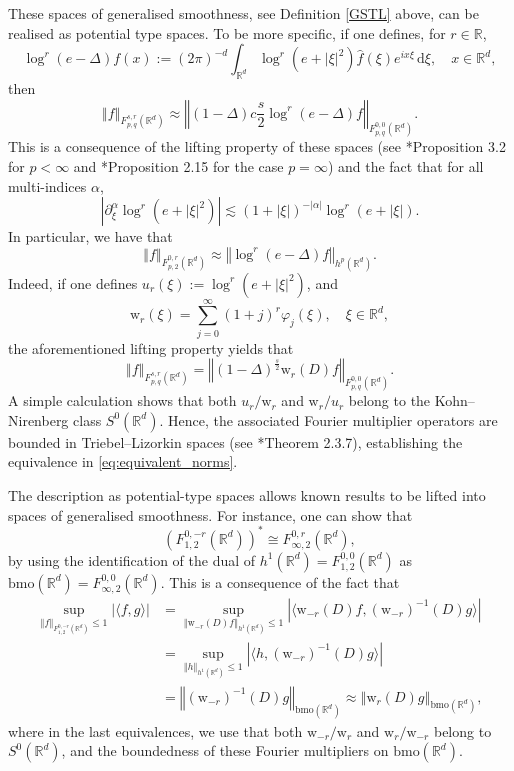 \documentclass[a4paper, leqno, 10pt]{amsart}
\numberwithin{equation}{section}
\newcommand{\dd}{\mathrm{d}}
\newcommand{\R}{\mathbb{R}}
\newcommand{\norm}[1]{\left\Vert#1\right\Vert}
\newcommand{\brkt}[1]{\left(#1\right)}
\newcommand{\abs}[1]{\left|#1\right|}
\begin{document}
These spaces of generalised smoothness, see Definition \ref{GSTL} above, can be realised as potential type spaces. To be more specific, if one defines, for $r\in \R$,
\[
\log^r(e-\Delta)f(x) :=(2\pi)^{-d}\int_{\R^d} \log^r(e+\abs{\xi}^2) \widehat{f}(\xi) e^{i x\xi} \, \dd \xi, \quad x \in \R^d,
\]
then 
\begin{equation}\label{eq:equivalent_norms}
\norm{f}_{F^{s,r}_{p,q} (\R^d) }\approx	\norm{(1-\Delta)c\frac{s}{2} \log^r(e-\Delta)f}_{F^{0,0}_{p,q} (\R^d) }.
\end{equation}
This is a consequence of the lifting property of these spaces (see \cite{cae-mou}*{Proposition 3.2} for $p<\infty$ and \cite{AR3}*{Proposition 2.15} for the case $p=\infty$) and the fact that for all multi-indices $\alpha$, 
\begin{equation}\label{right_symbol_class}
\abs{\partial_\xi^\alpha \log^r(e+\abs{\xi}^2)}\lesssim (1+\abs{\xi})^{-\abs{\alpha}}{\log^r(e+\abs{\xi})}.
\end{equation}
In particular, we have that
\[
\norm{f}_{F^{0,r}_{p,2}(\R^d)}\approx \norm{\log^r(e-\Delta)f}_{h^p(\R^d)}.
\]
Indeed, if one defines $u_r(\xi):=\log^r(e+\abs{\xi}^2)$,  and 
\begin{equation}\label{log_symbol}
\mathrm{w}_r(\xi)=\sum_{j=0}^\infty (1+j)^r\varphi_j(\xi),\quad \xi\in\R^d,
\end{equation}
the aforementioned lifting property yields that
\[
\norm{f}_{F^{s,r}_{p,q} (\R^d) }=	\norm{(1-\Delta)^\frac{s}{2} \mathrm{w}_r(D)f}_{F^{0,0}_{p,q} (\R^d)}.
\] 
A simple calculation shows that both $u_r/\mathrm{w}_r$ and $\mathrm{w}_r/u_r$ belong to the Kohn--Niren\-berg class $S^0(\R^d)$. Hence, the associated Fourier multiplier operators are bounded in Triebel--Lizorkin spaces (see \cite{Tri83}*{Theorem 2.3.7}), establishing the equivalence in \eqref{eq:equivalent_norms}.

The description as potential-type spaces allows known results to be lifted into spaces of generalised smoothness. For instance, one can show that 
\[
\brkt{F^{0,-r}_{1,2}(\R^d)}^{\ast} \cong F^{0,r}_{\infty,2}(\R^d),
\]
by using the identification of the dual of $h^1(\R^d)=F^{0,0}_{1,2}(\R^d)$ as $\mathrm{bmo}(\R^d)=F^{0,0}_{\infty,2}(\R^d)$. 
This is a consequence of the fact that 
\begin{align*}
\sup_{\norm{ f }_{F^{0,-r}_{1,2} ( \R^d )}\leq 1} |\langle f,g \rangle| & =\sup_{\norm{ \mathrm{w}_{-r}(D)f }_{h^1 ( \R^d ) }\leq 1} |\langle \mathrm{w}_{-r}(D)f, (\mathrm{w}_{-r})^{-1}(D)g \rangle|\\
&= \sup_{\norm{ h }_{h^1 (\R^d)}\leq 1} | \langle h,(\mathrm{w}_{-r})^{-1}(D)g \rangle|\\
&=\norm{ (\mathrm{w}_{-r})^{-1}(D) g }_{\mathrm{bmo} ( \R^d )}\approx \norm{\mathrm{w}_{r}(D)g }_{\mathrm{bmo}( \R^d ) } , %
%
\end{align*}
where in the last equivalences, we use that both $\mathrm{w}_{-r}/\mathrm{w}_r$ and $\mathrm{w}_{r}/\mathrm{w}_{-r}$ belong to $S^0(\R^d)$, and the boundedness of these Fourier multipliers on $\mathrm{bmo} (\R^d)$.
\end{document}
